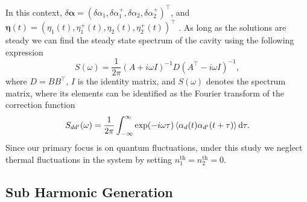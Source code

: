 \documentclass[fleqn,11pt]{wlscirep}
\begin{document}
In this context, $\delta\boldsymbol{\alpha} = (\delta\alpha_1,\delta\alpha_1^+,\delta\alpha_2,\delta\alpha_2^+)^{\intercal}$, and $\boldsymbol{\eta}(t) = (\eta_1(t),\eta_1^+(t),\eta_2(t),\eta_2^+(t))^{\intercal}$ \cite{olsen2013}. As long as the solutions are steady we can find the steady state spectrum of the cavity using the following expression \cite{drummond1980n,olsen2013} 
\begin{equation}\label{eq_spectrum}
	S(\omega) = \frac{1}{2\pi} (A + i\omega I)^{-1}D(A^{\intercal} - i\omega I)^{-1},
\end{equation}
where $D = BB^{\intercal}$, $I$ is the identity matrix, and $S(\omega)$ denotes the spectrum matrix, where its elements can be identified as the Fourier transform of the correction function
\begin{equation}
	S_{dd'}(\omega) = \frac{1}{2\pi} 
	\int_{-\infty}^{\infty} \exp(-i\omega \tau) \expval{\alpha_d(t)\alpha_{d'}(t+\tau)} \dd \tau.
\end{equation}
Since our primary focus is on quantum fluctuations, under this study we neglect thermal fluctuations in the system by setting $n^{\text{th}}_1 = n^{\text{th}}_2 = 0$. 

\subsection*{Sub Harmonic Generation}
\end{document}

